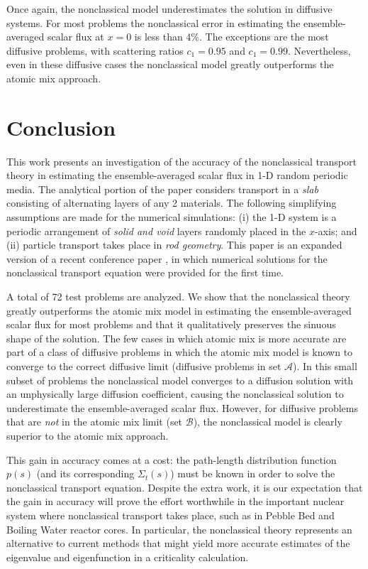 \documentclass[12pt]{article}
\newcommand{\seta}{\mathcal{A}}
\newcommand{\setb}{\mathcal{B}}
\begin{document}
{Once again, the nonclassical model underestimates the solution in diffusive systems.
For most problems the nonclassical error in estimating the ensemble-averaged scalar flux at $x=0$ is less than 4\%.
The exceptions are the most diffusive problems, with scattering ratios $c_1 = 0.95$ and $c_1 = 0.99$.
Nevertheless, even in these diffusive cases the nonclassical model greatly outperforms the atomic mix approach.

\section{Conclusion}\label{sec6}

This work presents an investigation of the accuracy of the nonclassical transport theory in estimating the ensemble-averaged scalar flux in 1-D random periodic media.
The analytical portion of the paper considers transport in a {\em slab} consisting of alternating layers of any 2 materials.
The following simplifying assumptions are made for the numerical simulations: (i) the 1-D system is a periodic arrangement of {\em solid and void} layers randomly placed in the $x$-axis; and (ii) particle transport takes place in {\em rod geometry}.
This paper is an expanded version of a recent conference paper \cite{mc15}, in which numerical solutions for the nonclassical transport equation were provided for the first time. 

A total of 72 test problems are analyzed.
We show that the nonclassical theory greatly outperforms the atomic mix model in estimating the ensemble-averaged scalar flux for most problems and that it qualitatively preserves the sinuous shape of the solution.
The few cases in which atomic mix is more accurate are part of a class of diffusive problems in which the atomic mix model is known to converge to the correct diffusive limit (diffusive problems in set $\seta$).
In this small subset of problems the nonclassical model converges to a diffusion solution with an unphysically large diffusion coefficient, causing the nonclassical solution to underestimate the ensemble-averaged scalar flux.
However, for diffusive problems that are {\em not} in the atomic mix limit (set $\setb$), the nonclassical model is clearly superior to the atomic mix approach.

This gain in accuracy comes at a cost: the path-length distribution function $p(s)$ (and its corresponding $\Sigma_t(s)$) must be known in order to solve the nonclassical transport equation.
Despite the extra work, it is our expectation that the gain in accuracy will prove the effort worthwhile in the important nuclear system where nonclassical transport takes place, such as in Pebble Bed and Boiling Water reactor cores.
In particular, the nonclassical theory represents an alternative to current methods that might yield more accurate estimates of the eigenvalue and eigenfunction in a criticality calculation.

}
\end{document}
